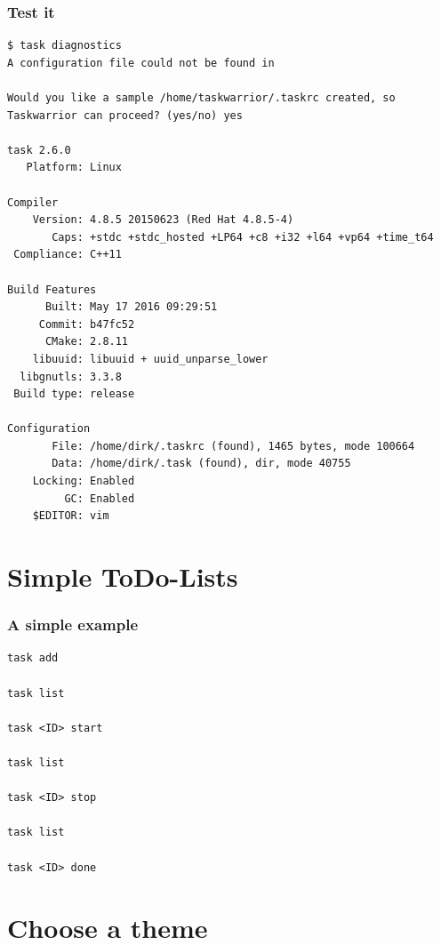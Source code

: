 \documentclass[t]{beamer}
\begin{document}
\begin{frame}[fragile]\frametitle{Test it}
    \vfill %
    \begin{lstlisting}
$ task diagnostics
A configuration file could not be found in

Would you like a sample /home/taskwarrior/.taskrc created, so Taskwarrior can proceed? (yes/no) yes

task 2.6.0
   Platform: Linux

Compiler
    Version: 4.8.5 20150623 (Red Hat 4.8.5-4)
       Caps: +stdc +stdc_hosted +LP64 +c8 +i32 +l64 +vp64 +time_t64
 Compliance: C++11

Build Features
      Built: May 17 2016 09:29:51
     Commit: b47fc52
      CMake: 2.8.11
    libuuid: libuuid + uuid_unparse_lower
  libgnutls: 3.3.8
 Build type: release

Configuration
       File: /home/dirk/.taskrc (found), 1465 bytes, mode 100664
       Data: /home/dirk/.task (found), dir, mode 40755
    Locking: Enabled
         GC: Enabled
    $EDITOR: vim\end{lstlisting}
\end{frame}


\section{Simple ToDo-Lists}

\begin{frame}[fragile]\frametitle{A simple example}
    \vfill
    \begin{lstlisting}
task add

task list

task <ID> start

task list

task <ID> stop

task list

task <ID> done\end{lstlisting}
\end{frame}

\section{Choose a theme}
\end{document}
